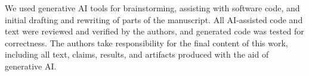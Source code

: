 We used generative AI tools for brainstorming, assisting with software code, and initial drafting and rewriting of parts of the manuscript. All AI-assisted code and text were reviewed and verified by the authors, and generated code was tested for correctness. The authors take responsibility for the final content of this work, including all text, claims, results, and artifacts produced with the aid of generative AI.